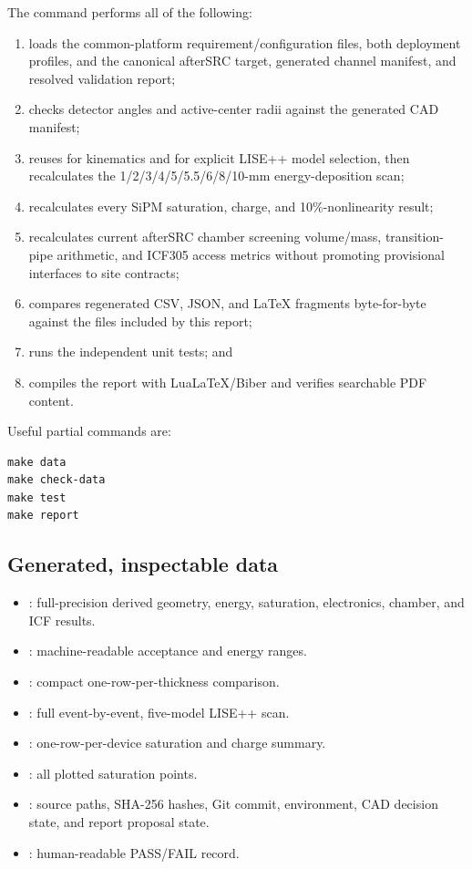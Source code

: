 \documentclass[10pt,letterpaper]{article}
\begin{document}
The command performs all of the following:
\begin{enumerate}
  \item loads the common-platform requirement/configuration files, both deployment profiles,
    and the canonical afterSRC target, generated channel manifest, and resolved validation report;
  \item checks detector angles and active-center radii against the generated CAD manifest;
  \item reuses  for kinematics and
     for explicit LISE++ model selection, then
    recalculates the 1/2/3/4/5/5.5/6/8/10-mm energy-deposition scan;
  \item recalculates every SiPM saturation, charge, and 10\%-nonlinearity result;
  \item recalculates current afterSRC chamber screening volume/mass, transition-pipe arithmetic,
    and ICF305 access metrics without promoting provisional interfaces to site contracts;
  \item compares regenerated CSV, JSON, and LaTeX fragments byte-for-byte against the files
    included by this report;
  \item runs the independent unit tests; and
  \item compiles the report with LuaLaTeX/Biber and verifies searchable PDF content.
\end{enumerate}

Useful partial commands are:
\begin{Verbatim}[fontsize=\small,frame=single]
make data
make check-data
make test
make report
\end{Verbatim}

\subsection{Generated, inspectable data}

\begin{itemize}
  \item {}: full-precision derived geometry, energy,
    saturation, electronics, chamber, and ICF results.
  \item {}: machine-readable acceptance and energy ranges.
  \item {}: compact one-row-per-thickness comparison.
  \item {}: full event-by-event, five-model LISE++ scan.
  \item {}: one-row-per-device saturation and charge summary.
  \item {}: all plotted saturation points.
  \item {}: source paths, SHA-256 hashes, Git commit, environment,
    CAD decision state, and report proposal state.
  \item {}: human-readable PASS/FAIL record.
\end{itemize}
\end{document}
